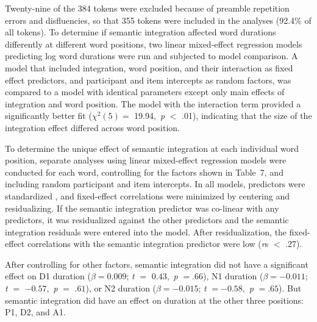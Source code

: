 \documentclass[12pt,titlepage]{article}
\begin{document}
Twenty-nine of the 384 tokens were excluded because of preamble repetition errors and disfluencies, so that 355 tokens were included in the analyses (92.4\% of all tokens). To determine if semantic integration affected word durations differently at different word positions, two linear mixed-effect regression models predicting log word durations were run and subjected to model comparison.  A model that included integration, word position, and their interaction as fixed effect predictors, and participant and item intercepts as random factors, was compared to a model with identical parameters except only main effects of integration and word position.  The model with the interaction term provided a significantly better fit ($\chi^{2}(5) =$ 19.94,~\textit{p} $<$ .01), indicating that the size of the integration effect differed across word position.

 To determine the unique effect of semantic integration at each individual word position, separate analyses using linear mixed-effect regression models were conducted for each word, controlling for the factors shown in Table~7, and including random participant and item intercepts.  In all models, predictors were standardized \cite{GelmanHill07}, and fixed-effect correlations were minimized by centering and residualizing. If the semantic integration predictor was co-linear with any predictors, it was residualized against the other predictors and the semantic integration residuals were entered into the model.  After residualization, the fixed-effect correlations with the semantic integration predictor were low (\textit{r}s $<$ .27).

 After controlling for other factors, semantic integration did not have a significant effect on D1 duration ($\beta = 0.009$; \textit{t} $=$ $0.43$,~\textit{p} $=$$.66$), N1 duration ($\beta =  -0.011$; \textit{t} $=$ $-0.57$,~\textit{p} $=$ $.61$), or N2 duration ($\beta = - 0.015$; \textit{t} $=$$ -0.58$,~\textit{p} $=$$.65$). But semantic integration did have an effect on duration at the other three positions:  P1, D2, and A1.




\end{document}
